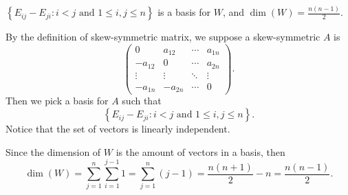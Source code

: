 \begin{Exercise}
\begin{answer}
$\left\{ E_{i j} - E_{j i}: i<j\text{ and } 1\leq i,j\leq n\right\}$ is a basis for $W$, and $\dim(W) = \frac{n(n-1)}{2}$.
\end{answer}
\begin{solution}
By the definition of skew-symmetric matrix, we suppose a skew-symmetric $A$ is
$$
\begin{pmatrix}
0 & a_{1 2} & \cdots & a_{1 n} \\
-a_{1 2} & 0 & \cdots & a_{2 n} \\
\vdots & \vdots & \ddots & \vdots \\
-a_{1 n} & -a_{2 n} & \cdots & 0
\end{pmatrix}.
$$
Then we pick a basis for $A$ such that
$$
\left\{ E_{i j} - E_{j i}: i<j\text{ and } 1\leq i,j\leq n\right\}.
$$
Notice that the set of vectors is linearly independent.

Since the dimension of $W$ is the amount of vectors in a basis, then
$$
\dim(W) = \sum_{j=1}^{n}\sum_{i=1}^{j-1} 1 = \sum_{j=1}^{n}(j-1) = \frac{n(n+1)}{2}-n = \frac{n(n-1)}{2}.
$$
\end{solution}
\end{Exercise}